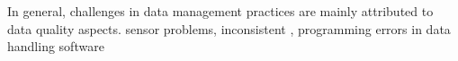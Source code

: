 In general, challenges in data management practices are mainly attributed to data quality aspects. \DIFdelbegin {}\DIFdelend \DIFaddbegin {}\DIFaddend sensor problems, inconsistent \DIFdelbegin {}\DIFdelend \DIFaddbegin {}\DIFaddend , programming errors in data handling software\DIFdelbegin {}\DIFdelend \DIFaddbegin {}\DIFaddend 



